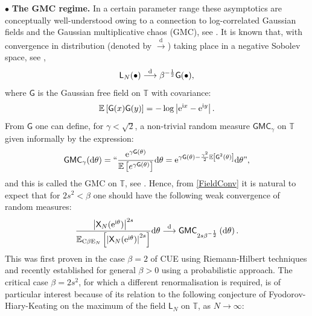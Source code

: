 \documentclass[]{article}
\begin{document}
$\bullet$ \textbf{The GMC regime.} In a certain parameter range these asymptotics are conceptually well-understood owing to a connection to log-correlated Gaussian fields and the Gaussian multiplicative chaos (GMC), see \cite{BaileyKeatingSurvey,KeatingWong}. It is known that, with convergence in distribution (denoted by $\overset{\mathrm{d}}{\longrightarrow}$) taking place in a negative Sobolev space, see \cite{HughesKeatingOConnell},
\begin{equation}\label{FieldConv}
\mathsf{L}_N(\bullet) \overset{\textnormal{d}}{\longrightarrow}   \beta^{-\frac{1}{2}}\mathsf{G}(\bullet),
\end{equation}
where $\mathsf{G}$ is the Gaussian free field on $\mathbb{T}$ with covariance: 
\begin{equation*}
\mathbb{E}\left[\mathsf{G}(x)\mathsf{G}(y)\right]=-\log\left|\mathrm{e}^{\textnormal{i}x}-\mathrm{e}^{\textnormal{i}y}\right|.
\end{equation*}
From $\mathsf{G}$ one can define, for $\gamma< \sqrt{2}$, a non-trivial random measure $\mathsf{GMC}_\gamma$ on $\mathbb{T}$ given informally by the expression:
\begin{equation*}
\mathsf{GMC}_\gamma(\mathrm{d}\theta)=``\frac{\mathrm{e}^{\gamma \mathsf{G}(\theta)}}{\mathbb{E}\left[e^{\gamma \mathsf{G}(\theta)}\right]}\mathrm{d}\theta=\mathrm{e}^{\gamma \mathsf{G}(\theta)-\frac{\gamma^2}{2}\mathbb{E}\left[\mathsf{G}^2(\theta)\right]}\mathrm{d}\theta",
\end{equation*}
and this is called the GMC on $\mathbb{T}$, see \cite{RhodesVargas,Berestycki}. Hence, from \eqref{FieldConv} it is natural to expect that for $2s^2<\beta$ one should have the following weak convergence of random measures:
\begin{equation}\label{GMCconvergence}
  \frac{\left|\mathsf{X}_N(\mathrm{e}^{\textnormal{i}\theta})\right|^{2s}}{\mathbb{E}_{\textnormal{C}\beta \textnormal{E}_N}\left[\left|\mathsf{X}_N(\mathrm{e}^{\textnormal{i}\theta})\right|^{2s}\right]}  \mathrm{d}\theta\overset{\textnormal{d}}{\longrightarrow} \mathsf{GMC}_{2s\beta^{-\frac{1}{2}}}\left(\mathrm{d}\theta\right).
\end{equation}
This was first proven in the case $\beta=2$ of CUE using Riemann-Hilbert techniques \cite{Webb,NikulaSaksmanWebb} and recently established for general $\beta>0$ \cite{LambertNajnudel} using a probabilistic approach. The critical case $\beta=2s^2$, for which a different renormalisation is required, is of particular interest because of its relation to the following conjecture of Fyodorov-Hiary-Keating \cite{FyodorovKeating,FyodorovHiaryKeating} on the maximum of the field $\mathsf{L}_N$ on $\mathbb{T}$, as $N \to \infty$:
\end{document}
